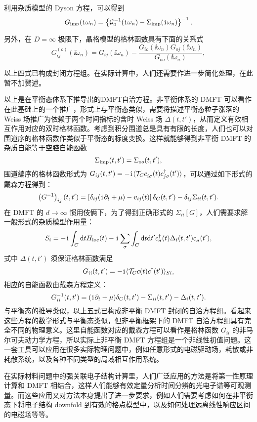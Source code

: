利用杂质模型的 Dyson 方程，可以得到 
\begin{equation}
    G_{\mathrm{imp}}(\hspace{0.1em}\mathrm{i}\hspace{0.1em}\omega_n)=\left\{ \mathcal{G}_0^{-1}(\hspace{0.1em}\mathrm{i}\hspace{0.1em}\omega_n)-\Sigma_{\mathrm{imp}}(\hspace{0.1em}\mathrm{i}\hspace{0.1em}\omega_n) \right\}^{-1},\label{dmftscf3}
\end{equation}

另外，在 $D=\infty$ 极限下，晶格模型的格林函数具有下面的关系式\cite{PhysRevB.77.235106} 
\begin{equation}
    G_{ij}^{(o)}(\ii\omega_n)=G_{ij}(\ii\omega_n)-\frac{G_{io}(\ii\omega_n)G_{oj}(\ii\omega_n)}{G_{oo}(\ii\omega_n)},\label{lattice-G}
\end{equation}

以上四式已构成封闭方程组。在实际计算中，人们还需要作进一步简化处理，在此暂不加赘述。

以上是在平衡态体系下推导出的DMFT自洽方程。非平衡体系的 DMFT 可以看作在此基础上的一个推广，形式上与平衡态类似，需要将描述平衡态粒子涨落的 Weiss 场推广为依赖于两个时间指标的含时 Weiss 场 $\Delta(t,t')$，从而定义有效相互作用对应的双时格林函数。考虑到积分围道总是具有有限的长度，人们也可以对围道序的格林函数作类似于平衡态的标度变换。这样就能够得到非平衡 DMFT 的杂质自能等于空腔自能函数 
\begin{equation}
    \Sigma_{\mathrm{imp}}(t, t')=\Sigma_{oo}(t,t'),
\end{equation}
围道编序的格林函数形式为 $G_{ij}(t,t')=-\hspace{0.1em}\mathrm{i}\hspace{0.1em} \langle \mathcal{T}_C c_{i\sigma}^{ }(t)c_{j\sigma}^\dagger (t') \rangle$，可以通过如下形式的戴森方程得到：
\begin{equation}
    \left( G^{-1} \right)_{ij}(t,t')=\left[ \delta_{ij}(\hspace{0.1em}\mathrm{i}\hspace{0.1em}\partial_t+\mu)-v_{ij}(t) \right] \delta_C(t,t')-\delta_{ij}\Sigma_{ii}(t,t').
\end{equation}
在 DMFT 的 $d\to \infty$ 惯用伎俩下，为了得到正确形式的 $\Sigma_{ii}[G]$，人们需要求解一般形式的杂质模型作用量：
\begin{equation}
    S_i=-\hspace{0.1em}\mathrm{i}\hspace{0.1em}\int_C\mathrm{d} tH_{\mathrm{loc}}(t)-\hspace{0.1em}\mathrm{i}\hspace{0.1em}\sum_\sigma\int_C\mathrm{d} t\mathrm{d} t' c_\sigma^\dagger (t)\Delta_i(t,t')c_\sigma^{ }(t'),
\end{equation}
式中 $\Delta(t,t')$ 须保证格林函数满足 
\begin{equation}
    G_{ii}(t,t')=-\hspace{0.1em}\mathrm{i}\hspace{0.1em}\langle \mathcal{T}_C c(t)c^\dagger (t') \rangle_{Si},
\end{equation}
相应的自能函数由戴森方程定义：
\begin{equation}
    G_{ii}^{-1}(t,t')=(\hspace{0.1em}\mathrm{i}\hspace{0.1em}\partial_t+\mu)\delta_C(t,t')-\Sigma_{ii}(t,t')-\Delta_i(t,t').
\end{equation}
与平衡态的推导类似，以上五式已构成非平衡 DMFT 封闭的自洽方程组。看起来这些方程的数学形式与平衡态类似，但非平衡框架下的 DMFT 自洽方程组具有完全不同的物理意义。这里自能函数对应的戴森方程可以看作是格林函数 $G_{ii}$ 的非马尔可夫动力学方程，所以实际上非平衡 DMFT 方程组是一个非线性初值问题。这一套工具可以应用在很多实际物理问题中，例如任意形式的电磁驱动场，耗散或非耗散系统，以及各种不同类型的局域相互作用系统。

在实际材料问题中的强关联电子结构计算里，人们广泛应用的方法是将第一性原理计算和 DMFT 相结合，这样人们能够有效定量分析时间分辨的光电子谱等可观测量。而这些应用又对方法本身提出了进一步要求，例如人们需要考虑如何在非平衡态下将电子结构 downfold 到有效的格点模型中，以及如何处理远离线性响应区间的电磁场等等。